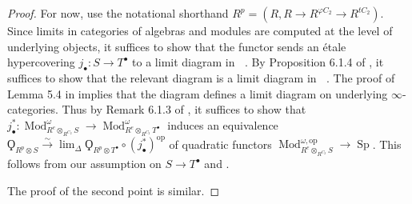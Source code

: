 \documentclass{article}
\DeclareMathOperator{\Cathidem}{Cat^h_{\infty,idem}} %
\DeclareMathOperator{\Catpidem}{Cat^p_{\infty, idem}} %
\DeclareMathOperator{\Mod}{Mod} %
\DeclareMathOperator{\Spectra}{Sp} %
\newcommand{\op}{\mathrm{op}} %
\theoremstyle{definition}
\begin{document}
\begin{proof}
    For now, use the notational shorthand $ R^p = (R, R\to R^{\varphi C_2} \to R^{tC_2}) $. 
    Since limits in categories of algebras and modules are computed at the level of underlying objects, it suffices to show that the functor sends an étale hypercovering $ j_\bullet \colon S \to T^\bullet $ to a limit diagram in $ \Catpidem $.  
    By Proposition 6.1.4 of \cite{CDHHLMNNSI}, it suffices to show that the relevant diagram is a limit diagram in $ \Cathidem $.  
    The proof of Lemma 5.4 in \cite{MR3190610} implies that the diagram defines a limit diagram on underlying $ \infty $-categories. 
    Thus by Remark 6.1.3 of \cite{CDHHLMNNSI}, it suffices to show that $ j_\bullet^* \colon \Mod^\omega_{R^e \otimes_{R^{C_2}} S} \to \Mod^\omega_{R^e \otimes_{R^{C_2}} T^\bullet} $ induces an equivalence $ \Qoppa_{R^p \otimes S} \xrightarrow{\sim} \lim_{\Delta} \Qoppa_{R^p \otimes T^\bullet} \circ \left(j_\bullet^*\right)^{\mathrm{op}} $ of quadratic functors $ \Mod^{\omega,\op}_{R^e \otimes_{R^{C_2}} S} \to \Spectra $. 
    This follows from our assumption on $ S \to T^\bullet $ and \cite[Theorem 3.3.1]{CDHHLMNNSI}. 

    The proof of the second point is similar.
\end{proof}
\end{document}
